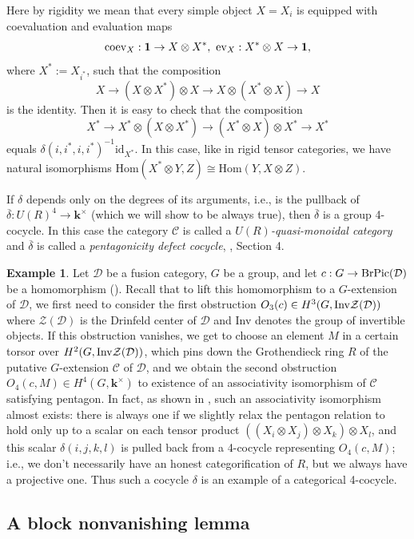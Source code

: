 \documentclass[12pt]{amsart}
\numberwithin{equation}{section}
\theoremstyle{definition}
\newtheorem{example}[theorem]{Example}
\newcommand{\id}{\text{id}}
\newcommand{\Hom}{\text{Hom}}
\newcommand{\1}{_{(1)}}
\newcommand{\2}{_{(2)}}
\newcommand{\3}{_{(3)}}
\newcommand{\4}{_{(4)}}
\newcommand{\5}{_{(5)}}
\newcommand{\6}{_{(6)}}
\newcommand{\C}{\mathcal{C}}
\theoremstyle{plain}
\theoremstyle{definition}
\theoremstyle{remark}
\def\C{\mathcal{C}}
\def\D{\mathcal{D}}
\def\Hom{\mathrm{Hom}}
\def\k{\mathbf{k}}
\def\ev{\mathrm{ev}}
\def\coev{\mathrm{coev}}
\begin{document}
Here by rigidity we mean that every simple object $X=X_i$ is equipped with coevaluation and evaluation maps 
$$
\coev_X: \bold 1\to X\otimes X^*,\
\ev_X: X^*\otimes X\to \bold 1,
$$
where $X^*:=X_{i^*}$, such that the composition
$$
X\to (X\otimes X^*)\otimes X\to X\otimes (X^*\otimes X)\to X
$$
is the identity. Then it is easy to check that the composition 
$$
X^*\to X^*\otimes (X\otimes X^*)\to (X^*\otimes X)\otimes X^*\to X^*
$$
equals $\delta(i,i^*,i,i^*)^{-1}\id_{X^*}$. In this case, like in rigid tensor categories, we
have natural isomorphisms $\Hom(X^*\otimes Y,Z)\cong \Hom(Y,X\otimes Z)$. 

If $\delta$ depends only on the degrees of its arguments, i.e., is the pullback of $\overline{\delta}: U(R)^4\to \k^\times$ (which we will show to be always true), then $\overline\delta$ is a group 4-cocycle. In this case the category $\C$ is called a {\it $U(R)$-quasi-monoidal category} and $\overline\delta$ is called a {\it pentagonicity defect cocycle}, \cite{JOY}, Section 4. 

\begin{example} Let $\D$ be a fusion category, $G$ be a group, and let  $c: G\to {\rm BrPic}(\D)$ be a 
homomorphism (\cite{ENO}). Recall that to lift this homomorphism to 
a $G$-extension of $\D$, we first need to consider the first obstruction 
$O_3(c)\in H^3(G,{\rm Inv}\mathcal Z(\D))$ where  $\mathcal Z(\D)$ is the Drinfeld center of $\mathcal D$ 
and Inv denotes the group of invertible objects. If this obstruction vanishes, we get to choose an element 
$M$ in a certain torsor over $H^2(G,{\rm Inv}\mathcal Z(\D))$, which pins down the Grothendieck ring $R$ of 
the putative $G$-extension $\C$ of $\D$, and we obtain the second obstruction $O_4(c,M)\in H^4(G,\k^\times)$ to existence of an associativity isomorphism of $\C$ satisfying pentagon. In fact, as shown in \cite{ENO}, such an associativity isomorphism almost exists: there is always one if we slightly relax the pentagon relation to hold only up to a scalar on each tensor product $((X_i\otimes X_j)\otimes X_k)\otimes X_l$, 
and this scalar $\delta(i,j,k,l)$ is pulled back from a 4-cocycle representing $O_4(c,M)$; i.e., we don't necessarily have an honest categorification of $R$, but we always have a projective one. 
Thus such a cocycle $\delta$ is an example of a categorical 4-cocycle.  
\end{example} 

\subsection{A block nonvanishing lemma} 
\end{document}
